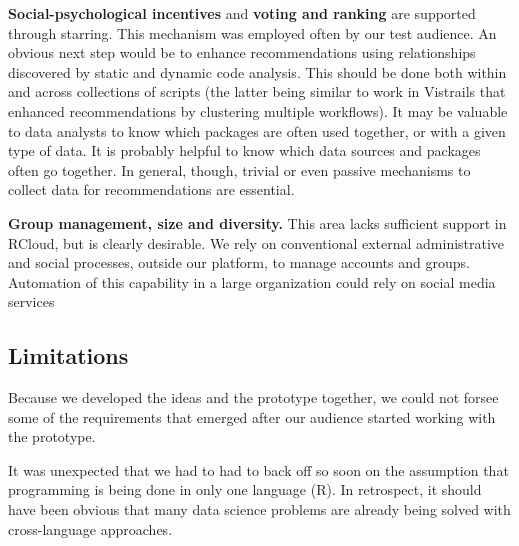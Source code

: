 {\bf Social-psychological incentives} and {\bf voting and ranking}
are supported through starring. This mechanism was employed often
by our test audience.  An obvious next step would be to enhance
recommendations using relationships discovered by static and
dynamic code analysis. This should be done both within and across
collections of scripts (the latter being similar to work in Vistrails
that enhanced recommendations by clustering multiple workflows).
It may be valuable to data analysts to know which packages are often
used together, or with a given type of data. It is probably helpful
to know which data sources and packages often go together. In general,
though, trivial or even passive mechanisms to collect data for
recommendations are essential.

{\bf Group management, size and diversity.} This area lacks sufficient
support in RCloud, but is clearly desirable. We rely on conventional
external administrative and social processes, outside our platform,
to manage accounts and groups.  Automation of this capability in a
large organization could rely on social media services

\subsection{Limitations}

Because we developed the ideas and the prototype together,
we could not forsee some of the requirements that emerged
after our audience started working with the prototype.

It was unexpected that we had to had to back off so soon on
the assumption that programming is being done in only one
language (R). In retrospect, it should have been obvious that
many data science problems are already being solved with
cross-language approaches.

